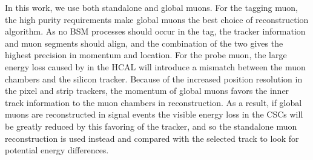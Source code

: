In this work, we use both standalone and global muons. 
For the tagging muon, the high purity requirements make global muons the best choice of reconstruction algorithm. 
As no BSM processes should occur in the tag, the tracker information and muon segments should align, and the combination of the two gives the highest precision in momentum and location. 
For the probe muon, the large energy loss caused by \dbrem in the HCAL will introduce a mismatch between the muon chambers and the silicon tracker. 
Because of the increased position resolution in the pixel and strip trackers, the momentum of global muons favors the inner track information to the muon chambers in reconstruction.
As a result, if global muons are reconstructed in signal events the visible energy loss in the CSCs will be greatly reduced by this favoring of the tracker, and so the standalone muon reconstruction is used instead and compared with the selected track to look for potential energy differences.
